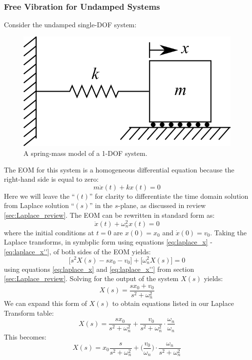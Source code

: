 \documentclass[12pt,letter]{article}
\begin{document}
			\subsubsection{Free Vibration for Undamped Systems}
			Consider the undamped single-DOF system:
			\begin{figure}[H]
				\centering
				\includegraphics[]{../figures/1-DOF-spring_mass_horizontal.png}
				\caption{A spring-mass model of a 1-DOF system.}
			\end{figure}
			\noindent The EOM for this system is a homogeneous differential equation because the right-hand side is equal to zero:
			\begin{equation}
				m\ddot{x}(t) + kx(t) = 0 
			\end{equation}
			Here we will leave the ``$(t)$'' for clarity to differentiate the time domain solution from Laplace solution ``$(s)$'' in the $s$-plane, as discussed in review \ref{sec:Laplace_review}. The EOM can be rewritten in standard form as:
			\begin{equation}
				\ddot{x}(t) + \omega_n^2x(t) = 0 
			\end{equation}
			where the initial conditions at $t=0$ are $x(0)=x_0$ and $\dot{x}(0) = v_0$. Taking the Laplace transforms, in symbplic form using equations \ref{eq:laplace_x} - \ref{eq:laplace_x''}, of both sides of the EOM yields:
			\begin{equation}
				\big[s^2X(s) -sx_0 -v_0 \big] + \big[ \omega_n^2X(s) \big] =0
			\end{equation}
			using equations \ref{eq:laplace_x} and \ref{eq:laplace_x''} from section \ref{sec:Laplace_review}. Solving for the output of the system $X(s)$ yields:
			\begin{equation}
			X(s) = \frac{sx_0 + v_0}{s^2 + \omega_n^2}
			\end{equation}
			We can expand this form of $X(s)$ to obtain equations listed in our Laplace Transform table:
			\begin{equation}
			X(s) = \frac{sx_0}{s^2 + \omega_n^2} + \frac{v_0}{s^2 + \omega_n^2}\cdot \frac{\omega_n}{\omega_n}
			\end{equation}
			This becomes:
			\begin{equation}
			X(s) = x_0\frac{s}{s^2 + \omega_n^2} + \bigg(\frac{v_0}{\omega_n}\bigg) \cdot \frac{\omega_n}{s^2 + \omega_n^2}
			\end{equation}
			
\end{document}
